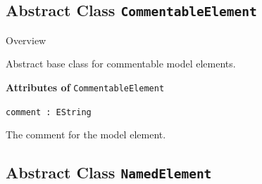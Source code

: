 \subsection{Abstract Class \bfseries \texttt{CommentableElement}\normalfont}
\label{cls:uppaal::core::CommentableElement} 
	
	\begin{longdescription}
		\item[Overview] 		
				

	

		Abstract base class for commentable model elements.		
		
	
			\item[\textbf{Attributes of} \texttt{CommentableElement}] ~
			\begin{longdescription}
	\item[\texttt{comment : EString 	}] ~
	
	
	\nopagebreak
		
				

	

		The comment for the model element.
			\end{longdescription}
	
	\end{longdescription}
	

\subsection{Abstract Class \bfseries \texttt{NamedElement}\normalfont}
\label{cls:uppaal::core::NamedElement} 
	
